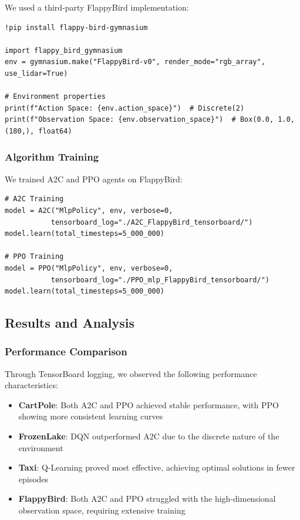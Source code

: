 \documentclass[12pt]{article}
\begin{document}
{{{We used a third-party FlappyBird implementation:

\begin{verbatim}
!pip install flappy-bird-gymnasium

import flappy_bird_gymnasium
env = gymnasium.make("FlappyBird-v0", render_mode="rgb_array", use_lidar=True)

# Environment properties
print(f"Action Space: {env.action_space}")  # Discrete(2)
print(f"Observation Space: {env.observation_space}")  # Box(0.0, 1.0, (180,), float64)
\end{verbatim}

\subsubsection{Algorithm Training}

We trained A2C and PPO agents on FlappyBird:

\begin{verbatim}
# A2C Training
model = A2C("MlpPolicy", env, verbose=0, 
           tensorboard_log="./A2C_FlappyBird_tensorboard/")
model.learn(total_timesteps=5_000_000)

# PPO Training
model = PPO("MlpPolicy", env, verbose=0, 
           tensorboard_log="./PPO_mlp_FlappyBird_tensorboard/")
model.learn(total_timesteps=5_000_000)
\end{verbatim}

\subsection{Results and Analysis}

\subsubsection{Performance Comparison}

Through TensorBoard logging, we observed the following performance characteristics:

\begin{itemize}
    \item \textbf{CartPole}: Both A2C and PPO achieved stable performance, with PPO showing more consistent learning curves
    \item \textbf{FrozenLake}: DQN outperformed A2C due to the discrete nature of the environment
    \item \textbf{Taxi}: Q-Learning proved most effective, achieving optimal solutions in fewer episodes
    \item \textbf{FlappyBird}: Both A2C and PPO struggled with the high-dimensional observation space, requiring extensive training
\end{itemize}

}}}
\end{document}
